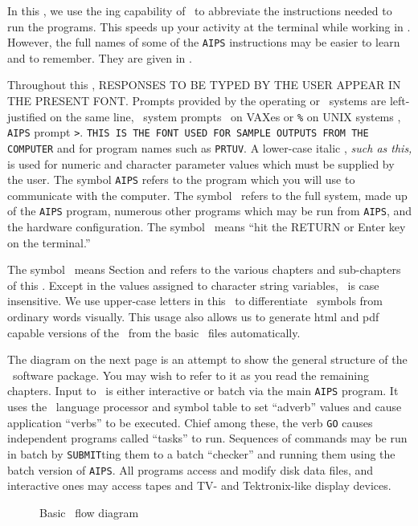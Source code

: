 
     In this \COOKBOOK, we use the
ing capability of \AIPS\ to abbreviate the
instructions needed to run the programs.  This speeds up your activity
at the terminal while working in \AIPS\@.  However, the full names of
some of the {\tt AIPS} instructions may be easier to learn and to
remember.  They are given in .


    Throughout this \COOKBOOK, {\us RESPONSES TO BE TYPED BY THE USER
APPEAR IN THE PRESENT FONT}\@.  Prompts provided by the operating or
\AIPS\ systems are left-justified on the same line, \eg\ system
prompts \dol\ on VAXes or {{\tt \%}} on UNIX systems , {\tt AIPS} prompt
\hbox{{\tt >}}.  {\tt THIS IS THE FONT USED FOR SAMPLE OUTPUTS FROM
THE COMPUTER} and for program names such as {\tt PRTUV}\@.  A
lower-case italic , {\it such as this,\/} is used for
numeric and character parameter values which must be supplied by the
user.  The symbol {\tt AIPS} refers to the program which you will use
to communicate with the computer.  The symbol \AIPS\ refers to the full
system, made up of the {\tt AIPS} program, numerous other programs
which may be run from {\tt AIPS}, and the hardware configuration.  The
symbol \CR\ means ``hit the {\us RETURN} or {\us Enter} key on the
terminal.''

The symbol \Schar\ means Section and refers to the various chapters and
sub-chapters of this \COOKBOOK\@.  Except in the values assigned to
character string variables, \AIPS\ is case insensitive.  We use
upper-case letters in this \COOKBOOK\ to differentiate \AIPS\ symbols
from ordinary words visually.  This usage also allows us to generate
html and pdf capable versions of the \COOKBOOK\ from the basic \TEX\
files automatically.


The diagram on the next page is an attempt to show the general
structure of the \AIPS\ software package.  You may wish to refer to it
as you read the remaining chapters.  Input to \AIPS\ is either
interactive or batch via the main {\tt AIPS} program.  It uses the
\POPS\ language processor and symbol table to set ``adverb''
values and cause application ``verbs'' to be executed.  Chief among
these, the verb {\tt GO} causes independent programs called ``tasks''
to run.  Sequences of commands may be run in batch by {\tt SUBMIT}ting
them to a batch ``checker'' and running them using the batch version
of {\tt AIPS}\@.  All programs access and modify disk data files, and
interactive ones may access tapes and TV- and Tektronix-like display
devices.\iodx{structure of \AIPS}

\vfill\eject
\begin{figure}
\caption{Basic \AIPS\ flow diagram}
\label{fig:aipsflow}
\end{figure}
